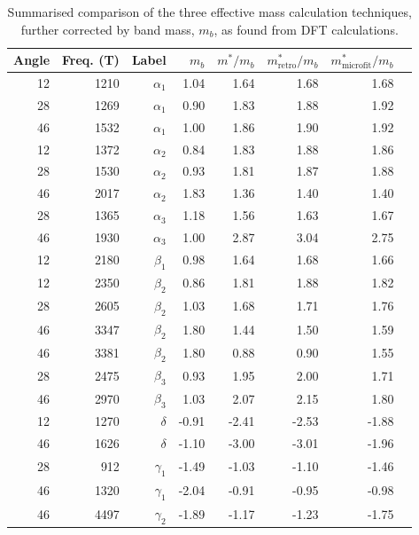 \begin{table}
    \begin{center}
        \caption{Summarised comparison of the three effective mass calculation techniques, further corrected by band mass, $m_b$, as found from DFT calculations.}
{\small
        \begin{tabular}[htbp]{rrrrrrrr}
\toprule
Angle	& Freq. (\unit{T})	& Label	 & $m_b$	& $m^*/m_b$	& $m^*_{\textrm{retro}}/m_b$	& $m^*_{\textrm{microfit}}/m_b$ \\
\midrule
12	& 1210	& $\alpha_1$	& 1.04	& 1.64	& 1.68 & 1.68	\\
28	& 1269	& $\alpha_1$	& 0.90	& 1.83	& 1.88 & 1.92	\\
46	& 1532	& $\alpha_1$	& 1.00	& 1.86	& 1.90 & 1.92	\\
12	& 1372	& $\alpha_2$	& 0.84	& 1.83	& 1.88 & 1.86	\\
28	& 1530	& $\alpha_2$	& 0.93	& 1.81	& 1.87 & 1.88	\\
46	& 2017	& $\alpha_2$	& 1.83	& 1.36	& 1.40 & 1.40	\\
28	& 1365	& $\alpha_3$	& 1.18	& 1.56	& 1.63 & 1.67	\\
46	& 1930	& $\alpha_3$	& 1.00	& 2.87	& 3.04 & 2.75	\\
12	& 2180	& $\beta_1$ 	& 0.98	& 1.64	& 1.68 & 1.66	\\
12	& 2350	& $\beta_2$ 	& 0.86	& 1.81	& 1.88 & 1.82	\\
28	& 2605	& $\beta_2$ 	& 1.03	& 1.68	& 1.71 & 1.76	\\
46	& 3347	& $\beta_2$ 	& 1.80	& 1.44	& 1.50 & 1.59	\\
46	& 3381	& $\beta_2$ 	& 1.80	& 0.88	& 0.90 & 1.55	\\
28	& 2475	& $\beta_3$ 	& 0.93	& 1.95	& 2.00 & 1.71	\\
46	& 2970	& $\beta_3$ 	& 1.03	& 2.07	& 2.15 & 1.80	\\
12	& 1270	& $\delta$  	& -0.91	& -2.41	& -2.53& -1.88	 \\
46	& 1626	& $\delta$  	& -1.10	& -3.00	& -3.01& -1.96	 \\
28	& 912	& $\gamma_1$	& -1.49	& -1.03	& -1.10& -1.46	 \\
46	& 1320	& $\gamma_1$	& -2.04	& -0.91	& -0.95& -0.98	 \\
46	& 4497	& $\gamma_2$	& -1.89	& -1.17	& -1.23& -1.75	 \\
\bottomrule
        \end{tabular}
}
        \label{Table:3:EffectiveMassResults}
    \end{center}
\end{table}
